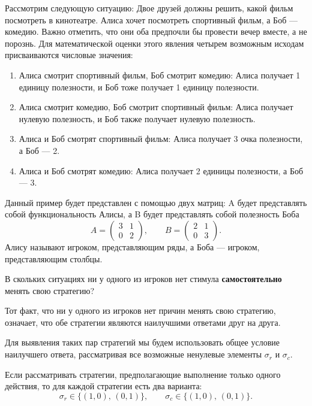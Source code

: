 Рассмотрим следующую ситуацию: Двое друзей должны решить, какой фильм посмотреть в кинотеатре. Алиса хочет посмотреть спортивный фильм, а Боб — комедию. Важно отметить, что они оба предпочли бы провести вечер вместе, а не порознь.
Для математической оценки этого явления четырем возможным исходам присваиваются числовые значения:
\begin{enumerate}
  \item Алиса смотрит спортивный фильм, Боб смотрит комедию: Алиса получает 1 единицу полезности, и Боб тоже получает 1 единицу полезности.
  \item Алиса смотрит комедию, Боб смотрит спортивный фильм: Алиса получает нулевую полезность, и Боб также получает нулевую полезность.
  \item Алиса и Боб смотрят спортивный фильм: Алиса получает 3 очка полезности, а Боб — 2.
  \item Алиса и Боб смотрят комедию: Алиса получает 2 единицы полезности, а Боб — 3.
\end{enumerate}
Данный пример будет представлен с помощью двух матриц: A  будет представлять собой функциональность Алисы, а B будет представлять собой полезность Боба
\begin{equation}
A = \begin{pmatrix} 3 & 1 \\ 0 & 2 \end{pmatrix},
  \qquad
  B = \begin{pmatrix} 2 & 1 \\ 0 & 3 \end{pmatrix}.
\end{equation}
Алису называют игроком, представляющим ряды, а Боба — игроком, представляющим столбцы.

В скольких ситуациях ни у одного из игроков нет стимула
\textbf{самостоятельно} менять свою стратегию?

Тот факт, что ни у одного из игроков нет причин менять свою стратегию, означает, что обе стратегии являются наилучшими ответами друг на друга.

Для выявления таких пар стратегий мы будем использовать общее условие наилучшего ответа, рассматривая все возможные ненулевые элементы \(\sigma_r\) и \(\sigma_c\).

Если рассматривать стратегии, предполагающие выполнение только одного действия, то для каждой стратегии есть два варианта:
\begin{equation}
\sigma_r \in \{(1,0),\,(0,1)\},
  \qquad
  \sigma_c \in \{(1,0),\,(0,1)\}.
\end{equation}

